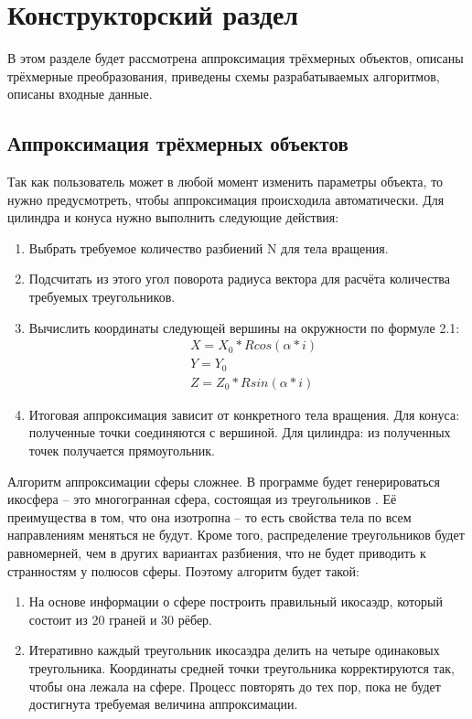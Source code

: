 \chapter{Конструкторский раздел}
В этом разделе будет рассмотрена аппроксимация трёхмерных объектов, описаны трёхмерные преобразования,
приведены схемы разрабатываемых алгоритмов, описаны входные данные. 

\section{Аппроксимация трёхмерных объектов}
Так как пользователь может в любой момент изменить параметры объекта, то нужно предусмотреть, чтобы аппроксимация происходила автоматически.
Для цилиндра и конуса нужно выполнить следующие действия:
\begin{enumerate}
	\item Выбрать требуемое количество разбиений N для тела вращения.
	\item Подсчитать из этого угол поворота радиуса вектора для расчёта количества требуемых треугольников.
	\item Вычислить координаты следующей вершины на окружности по формуле 2.1:
	\begin{equation}
	\begin{aligned}
		& X = X_0 * Rcos(\alpha * i) \\ 
		& Y = Y_0  \\ 
		& Z = Z_0 * Rsin(\alpha * i)
	\end{aligned}
	\end{equation}
	\item Итоговая аппроксимация зависит от конкретного тела вращения. 
	Для конуса: полученные точки соединяются с вершиной. 
	Для цилиндра: из полученных точек получается прямоугольник.
\end{enumerate}

Алгоритм аппроксимации сферы сложнее. 
В программе будет генерироваться икосфера – это многогранная сфера, состоящая из треугольников \cite{ico}. 
Её преимущества в том, что она изотропна – то есть свойства тела по всем направлениям меняться не будут.
Кроме того, распределение треугольников будет равномерней, чем в других вариантах разбиения, что не будет приводить к странностям у полюсов сферы.
Поэтому алгоритм будет такой:
\begin{enumerate}
	\item На основе информации о сфере построить правильный икосаэдр, который состоит из 20 граней и 30 рёбер.
	\item Итеративно каждый треугольник икосаэдра делить на четыре одинаковых треугольника. 
	Координаты средней точки треугольника корректируются так, чтобы она лежала на сфере. 
	Процесс повторять до тех пор, пока не будет достигнута требуемая величина аппроксимации.
\end{enumerate}

